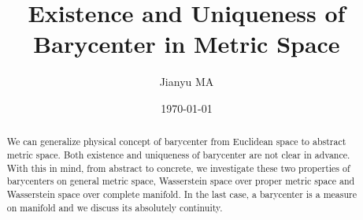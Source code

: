 \documentclass{report}
\title{Existence and Uniqueness of Barycenter in Metric Space}
\author{Jianyu MA}
\date{\today}
\theoremstyle{remark}
\theoremstyle{definition}
\begin{document}
\maketitle

\begin{abstract}
	We can generalize physical concept of barycenter from Euclidean space to abstract metric space.
	Both existence and uniqueness of barycenter are not clear in advance.
	With this in mind, from abstract to concrete,
	we investigate these two properties of barycenters on general metric space,
	Wasserstein space over proper metric space and Wasserstein space over complete manifold.
	In the last case, a barycenter is a measure on manifold and we discuss its absolutely continuity.
\end{abstract}

\tableofcontents













% 
% 
% 

\printbibliography
\end{document}
